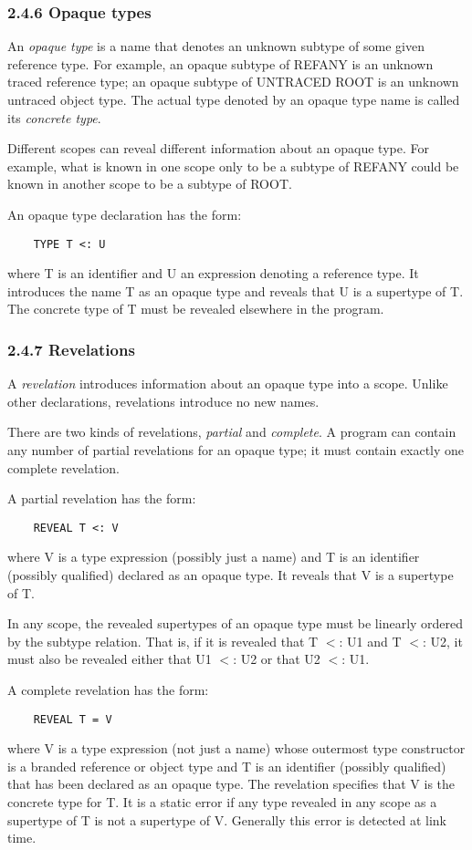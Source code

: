 \documentclass[10pt]{article}
\begin{document}
\subsubsection*{2.4.6 Opaque types}

An \emph{opaque type} is a name that denotes an unknown subtype of some given
reference type.  For example, an opaque subtype of REFANY is an unknown traced
reference type; an opaque subtype of UNTRACED ROOT is an unknown untraced
object type.  The actual type denoted by an opaque type name is called its
\emph{concrete type}.

Different scopes can reveal different information about an opaque type.  For
example, what is known in one scope only to be a subtype of REFANY could be
known in another scope to be a subtype of ROOT.

An opaque type declaration has the form:
\begin{verbatim}
    TYPE T <: U
\end{verbatim}
where T is an identifier and U an expression denoting a reference type.  It
introduces the name T as an opaque type and reveals that U is a supertype of
T.  The concrete type of T must be revealed elsewhere in the program.

\subsubsection*{2.4.7 Revelations}

A \emph{revelation} introduces information about an opaque type into a scope.
Unlike other declarations, revelations introduce no new names.

There are two kinds of revelations, \emph{partial} and \emph{complete}.  A
program can contain any number of partial revelations for an opaque type; it
must contain exactly one complete revelation.

A partial revelation has the form:
\begin{verbatim}
    REVEAL T <: V
\end{verbatim}
where V is a type expression (possibly just a name) and T is an identifier
(possibly qualified) declared as an opaque type.  It reveals that V is a
supertype of T.

In any scope, the revealed supertypes of an opaque type must be linearly
ordered by the subtype relation.  That is, if it is revealed that T $<$: U1
and T $<$: U2, it must also be revealed either that U1 $<$: U2 or that U2 $<$:
U1.

A complete revelation has the form:
\begin{verbatim}
    REVEAL T = V
\end{verbatim}
where V is a type expression (not just a name) whose outermost type
constructor is a branded reference or object type and T is an identifier
(possibly qualified) that has been declared as an opaque type.  The revelation
specifies that V is the concrete type for T.  It is a static error if any type
revealed in any scope as a supertype of T is not a supertype of V.  Generally
this error is detected at link time.
\end{document}
